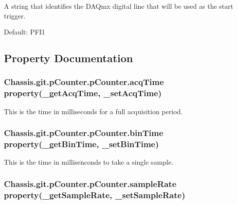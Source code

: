 A string that identifies the D\-A\-Qmx digital line that will be used as the start trigger. 

Default\-: P\-F\-I1 

\subsection{Property Documentation}
\hypertarget{class_chassis_8git_1_1p_counter_1_1p_counter_a052d0809530db74794149e44570812d9}{
\subsubsection[{acq\-Time}]{\setlength{\rightskip}{0pt plus 5cm}Chassis.\-git.\-p\-Counter.\-p\-Counter.\-acq\-Time property(\-\_\-get\-Acq\-Time, \-\_\-set\-Acq\-Time)\hspace{0.3cm}{\ttfamily [static]}}}\label{class_chassis_8git_1_1p_counter_1_1p_counter_a052d0809530db74794149e44570812d9}


This is the time in milliseconds for a full acquisition period. 

\hypertarget{class_chassis_8git_1_1p_counter_1_1p_counter_a490e12592d8045195f68cc17bcc8fcf4}{
\subsubsection[{bin\-Time}]{\setlength{\rightskip}{0pt plus 5cm}Chassis.\-git.\-p\-Counter.\-p\-Counter.\-bin\-Time property(\-\_\-get\-Bin\-Time, \-\_\-set\-Bin\-Time)\hspace{0.3cm}{\ttfamily [static]}}}\label{class_chassis_8git_1_1p_counter_1_1p_counter_a490e12592d8045195f68cc17bcc8fcf4}


This is the time in millisenconds to take a single sample. 

\hypertarget{class_chassis_8git_1_1p_counter_1_1p_counter_a29044984e50fe6405e37cf63880c0bf6}{
\subsubsection[{sample\-Rate}]{\setlength{\rightskip}{0pt plus 5cm}Chassis.\-git.\-p\-Counter.\-p\-Counter.\-sample\-Rate property(\-\_\-get\-Sample\-Rate, \-\_\-set\-Sample\-Rate)\hspace{0.3cm}{\ttfamily [static]}}}\label{class_chassis_8git_1_1p_counter_1_1p_counter_a29044984e50fe6405e37cf63880c0bf6}


